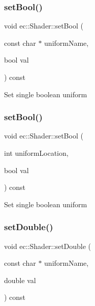 \subsubsection{\texorpdfstring{set\+Bool()}{setBool()}\hspace{0.1cm}{\footnotesize\ttfamily [1/2]}}
{\footnotesize\ttfamily void ec\+::\+Shader\+::set\+Bool (\begin{DoxyParamCaption}\item[{const char $\ast$}]{uniform\+Name,  }\item[{bool}]{val }\end{DoxyParamCaption}) const}

Set single boolean uniform \mbox{\label{classec_1_1_shader_acb2a56cad426e5c7e51b6912dcfbeefd}} 
\subsubsection{\texorpdfstring{set\+Bool()}{setBool()}\hspace{0.1cm}{\footnotesize\ttfamily [2/2]}}
{\footnotesize\ttfamily void ec\+::\+Shader\+::set\+Bool (\begin{DoxyParamCaption}\item[{int}]{uniform\+Location,  }\item[{bool}]{val }\end{DoxyParamCaption}) const}

Set single boolean uniform \mbox{\label{classec_1_1_shader_a096e33dd5ffe44b1f9ea80f4bf7c59ea}} 
\subsubsection{\texorpdfstring{set\+Double()}{setDouble()}\hspace{0.1cm}{\footnotesize\ttfamily [1/2]}}
{\footnotesize\ttfamily void ec\+::\+Shader\+::set\+Double (\begin{DoxyParamCaption}\item[{const char $\ast$}]{uniform\+Name,  }\item[{double}]{val }\end{DoxyParamCaption}) const}

